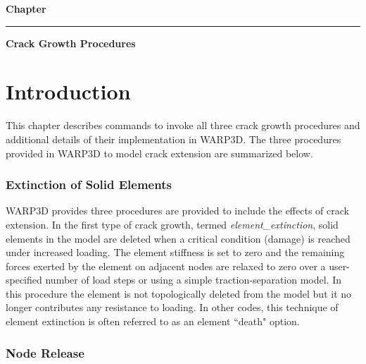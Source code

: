 \documentclass[11pt]{report}
\numberwithin{equation}{section}
\begin{document}
\LARGE
\hfill
\textbf{Chapter \thechapter}
\rule[0.15in]{450pt}{0.5mm}
\LARGE
\begin{flushright}
 \textbf{
{\selectfont Crack Growth Procedures}}
\end{flushright}
\normalsize


\section{Introduction}
\noindent 
This chapter describes commands to invoke all three crack growth procedures and
additional details of their implementation in WARP3D. The three procedures
provided in WARP3D to model crack extension are summarized below. 

\subsubsection{Extinction of Solid Elements}

WARP3D provides three procedures are provided to include the effects of crack
extension. In the first type of crack growth, termed \textit{element\_extinction},
solid elements in the model are deleted when a critical condition (damage) is reached
under increased loading. The element stiffness is set to
zero and the remaining forces exerted by the element on adjacent nodes are relaxed to zero
over a user-specified number of load steps or using a simple traction-separation
model. In this procedure the element is not topologically deleted from the model
but it no longer contributes any resistance to loading. In other codes, this
technique of element extinction is often referred to as an element ``death"
option.

\subsubsection{Node Release}
\end{document}
